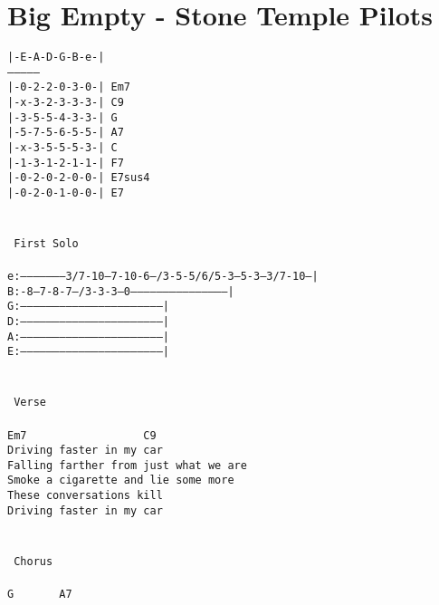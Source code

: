 \newpage
\section{Big Empty - Stone Temple Pilots}
\label{Big Empty - Stone Temple Pilots}
\texttt{|-E-A-D-G-B-e-|\\
---------------\\
|-0-2-2-0-3-0-|\ Em7\\
|-x-3-2-3-3-3-|\ C9\\
|-3-5-5-4-3-3-|\ G\\
|-5-7-5-6-5-5-|\ A7\\
|-x-3-5-5-5-3-|\ C\\
|-1-3-1-2-1-1-|\ F7\\
|-0-2-0-2-0-0-|\ E7sus4\\
|-0-2-0-1-0-0-|\ E7\\
\\
\\
\lbrack\ First\ Solo\rbrack\\
\\
e:---------------------3/7-10--7-10-6--/3-5-5/6/5-3--5-3--3/7-10---|\\
B:-8--7-8-7--/3-3-3--0---------------------------------------------|\\
G:-----------------------------------------------------------------|\\
D:-----------------------------------------------------------------|\\
A:-----------------------------------------------------------------|\\
E:-----------------------------------------------------------------|\\
\\
\\
\lbrack\ Verse\rbrack\\
\\
Em7\ \ \ \ \ \ \ \ \ \ \ \ \ \ \ \ \ \ C9\\
Driving\ faster\ in\ my\ car\\
Falling\ farther\ from\ just\ what\ we\ are\\
Smoke\ a\ cigarette\ and\ lie\ some\ more\\
These\ conversations\ kill\\
Driving\ faster\ in\ my\ car\\
\\
\\
\lbrack\ Chorus\rbrack\\
\\
G\ \ \ \ \ \ \ A7\ \ \ \ \ \ \\
}
